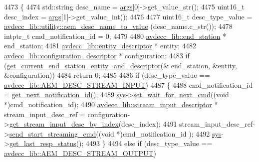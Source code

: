 \begin{DoxyCode}
4473 \{
4474     std::string desc\_name = \hyperlink{namespaceastime__fitline_a8187411843a6284ffb964ef3fb9fcab3}{args}[0]->get\_value\_str();
4475     uint16\_t desc\_index = \hyperlink{namespaceastime__fitline_a8187411843a6284ffb964ef3fb9fcab3}{args}[1]->get\_value\_int();
4476 
4477     uint16\_t desc\_type\_value = \hyperlink{namespaceavdecc__lib_1_1utility_a9f6076e32fa227555a95b6e95ea1e29b}{avdecc\_lib::utility::aem\_desc\_name\_to\_value}
      (desc\_name.c\_str());
4478     intptr\_t cmd\_notification\_id = 0;
4479 
4480     \hyperlink{classavdecc__lib_1_1end__station}{avdecc\_lib::end\_station} * end\_station;
4481     \hyperlink{classavdecc__lib_1_1entity__descriptor}{avdecc\_lib::entity\_descriptor} * entity;
4482     \hyperlink{classavdecc__lib_1_1configuration__descriptor}{avdecc\_lib::configuration\_descriptor} * configuration;
4483     \textcolor{keywordflow}{if} (\hyperlink{classcmd__line_ac2d4611fba7db03d436a2e3c1e64828e}{get\_current\_end\_station\_entity\_and\_descriptor}(&
      end\_station, &entity, &configuration))
4484         \textcolor{keywordflow}{return} 0;
4485 
4486     \textcolor{keywordflow}{if} (desc\_type\_value == \hyperlink{namespaceavdecc__lib_ac7b7d227e46bc72b63ee9e9aae15902fa00d002e47651a1b007d50f9f2da51e53}{avdecc\_lib::AEM\_DESC\_STREAM\_INPUT})
4487     \{
4488         cmd\_notification\_id = \hyperlink{classcmd__line_a57486218387d1aa9d262eb7c176154ad}{get\_next\_notification\_id}();
4489         \hyperlink{classcmd__line_a485db4800e331cb4052c447fdf5d154e}{sys}->\hyperlink{classavdecc__lib_1_1system_a26b769584f10225077da47583edda33e}{set\_wait\_for\_next\_cmd}((\textcolor{keywordtype}{void} *)cmd\_notification\_id);
4490         \hyperlink{classavdecc__lib_1_1stream__input__descriptor}{avdecc\_lib::stream\_input\_descriptor} * stream\_input\_desc\_ref = 
      configuration->\hyperlink{classavdecc__lib_1_1configuration__descriptor_a69cfe9032cea21937b4153878f8a925c}{get\_stream\_input\_desc\_by\_index}(desc\_index);
4491         stream\_input\_desc\_ref->\hyperlink{classavdecc__lib_1_1stream__input__descriptor_a9b919107737ba0b3d86c2c316cf3a765}{send\_start\_streaming\_cmd}((\textcolor{keywordtype}{void} *)cmd\_notification\_id
      );
4492         \hyperlink{classcmd__line_a485db4800e331cb4052c447fdf5d154e}{sys}->\hyperlink{classavdecc__lib_1_1system_aa63e8d1a4e51f695cdcccc9340922407}{get\_last\_resp\_status}();
4493     \}
4494     \textcolor{keywordflow}{else} \textcolor{keywordflow}{if} (desc\_type\_value == \hyperlink{namespaceavdecc__lib_ac7b7d227e46bc72b63ee9e9aae15902fa3e5e9421e49598854000feaa2fe71464}{avdecc\_lib::AEM\_DESC\_STREAM\_OUTPUT})

\end{DoxyCode}
